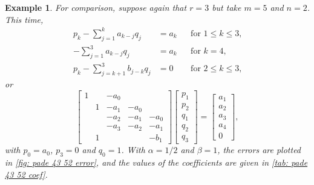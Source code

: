 \documentclass[12pt,a4paper]{article}
\newtheorem{example}{Example}
\begin{document}
\begin{example}
For comparison, suppose again that $r=3$ but take $m=5$ and $n=2$.  This time,
\[
\begin{aligned}
p_k-\sum_{j=1}^ka_{k-j}q_j&=a_k&&\text{for $1\le k\le 3$,}\\
-\sum_{j=1}^3a_{k-j}q_j&=a_k&&\text{for $k=4$,}\\
p_k-\sum_{j=k+1}^3b_{j-k}q_j&=0&&\text{for $2\le k\le 3$,}
\end{aligned}
\]
or
\[
\begin{bmatrix}
1& &-a_0&    &    \\
 &1&-a_1&-a_0&    \\
 & &-a_2&-a_1&-a_0\\
 & &-a_3&-a_2&-a_1\\
 &1&    &    &-b_1
\end{bmatrix}
\begin{bmatrix}p_1\\ p_2\\ q_1\\ q_2\\ q_3\end{bmatrix}
=\begin{bmatrix}a_1\\ a_2\\ a_3\\ a_4\\ 0\end{bmatrix},
\]
with $p_0=a_0$, $p_3=0$ and $q_0=1$.  With $\alpha=1/2$ and $\beta=1$, the 
errors are plotted in \cref{fig: pade 43 52 error}, and the values of the 
coefficients are given in \cref{tab: pade 43 52 coef}.
\end{example}
\end{document}
